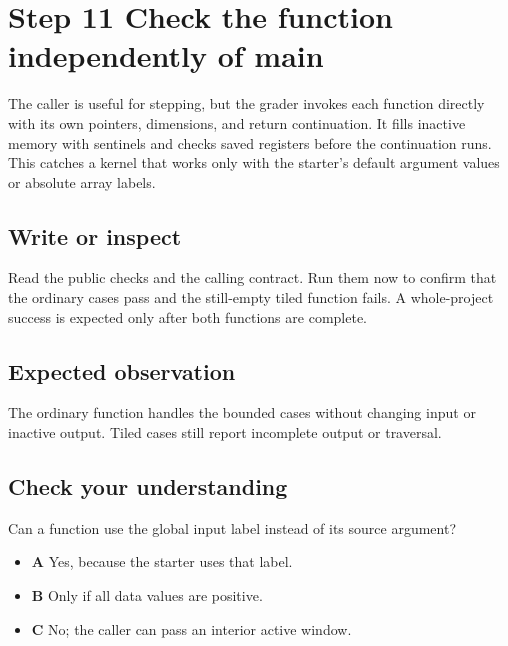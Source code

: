 \section{Step 11 Check the function independently of main}\label{transpose-s11}

The caller is useful for stepping, but the grader invokes each function directly with its own pointers, dimensions, and return continuation. It fills inactive memory with sentinels and checks saved registers before the continuation runs. This catches a kernel that works only with the starter's default argument values or absolute array labels.

\subsection{Write or inspect}
Read the public checks and the calling contract. Run them now to confirm that the ordinary cases pass and the still-empty tiled function fails. A whole-project success is expected only after both functions are complete.

\subsection{Expected observation}
The ordinary function handles the bounded cases without changing input or inactive output. Tiled cases still report incomplete output or traversal.

\subsection{Check your understanding}
Can a function use the global input label instead of its source argument?

\begin{itemize}
  \item \textbf{A} Yes, because the starter uses that label.
  \item \textbf{B} Only if all data values are positive.
  \item \textbf{C} No; the caller can pass an interior active window.
\end{itemize}
